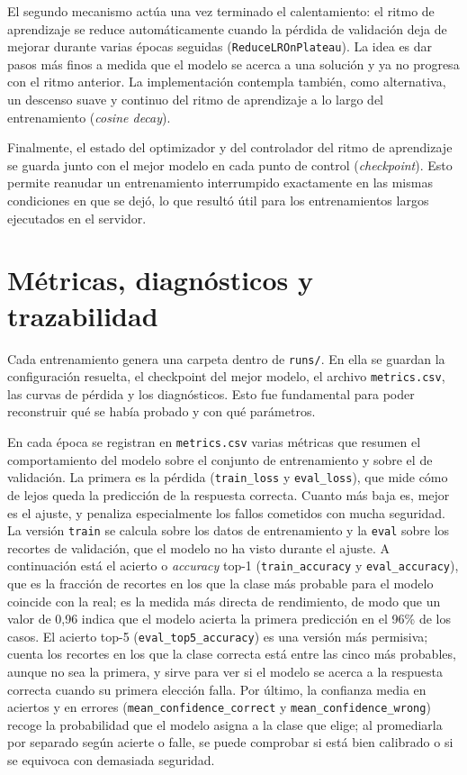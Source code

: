 El segundo mecanismo actúa una vez terminado el calentamiento: el ritmo de aprendizaje se reduce automáticamente cuando la pérdida de validación deja de mejorar durante varias épocas seguidas (\texttt{ReduceLROnPlateau}). La idea es dar pasos más finos a medida que el modelo se acerca a una solución y ya no progresa con el ritmo anterior. La implementación contempla también, como alternativa, un descenso suave y continuo del ritmo de aprendizaje a lo largo del entrenamiento (\textit{cosine decay}).

Finalmente, el estado del optimizador y del controlador del ritmo de aprendizaje se guarda junto con el mejor modelo en cada punto de control (\textit{checkpoint}). Esto permite reanudar un entrenamiento interrumpido exactamente en las mismas condiciones en que se dejó, lo que resultó útil para los entrenamientos largos ejecutados en el servidor.

\section{Métricas, diagnósticos y trazabilidad}

Cada entrenamiento genera una carpeta dentro de \texttt{runs/}. En ella se guardan la configuración resuelta, el checkpoint del mejor modelo, el archivo \texttt{metrics.csv}, las curvas de pérdida y los diagnósticos. Esto fue fundamental para poder reconstruir qué se había probado y con qué parámetros.

En cada época se registran en \texttt{metrics.csv} varias métricas que resumen el comportamiento del modelo sobre el conjunto de entrenamiento y sobre el de validación. La primera es la pérdida (\texttt{train\_loss} y \texttt{eval\_loss}), que mide cómo de lejos queda la predicción de la respuesta correcta. Cuanto más baja es, mejor es el ajuste, y penaliza especialmente los fallos cometidos con mucha seguridad. La versión \texttt{train} se calcula sobre los datos de entrenamiento y la \texttt{eval} sobre los recortes de validación, que el modelo no ha visto durante el ajuste. A continuación está el acierto o \textit{accuracy} top-1 (\texttt{train\_accuracy} y \texttt{eval\_accuracy}), que es la fracción de recortes en los que la clase más probable para el modelo coincide con la real; es la medida más directa de rendimiento, de modo que un valor de 0,96 indica que el modelo acierta la primera predicción en el 96\% de los casos. El acierto top-5 (\texttt{eval\_top5\_accuracy}) es una versión más permisiva; cuenta los recortes en los que la clase correcta está entre las cinco más probables, aunque no sea la primera, y sirve para ver si el modelo se acerca a la respuesta correcta cuando su primera elección falla. Por último, la confianza media en aciertos y en errores (\texttt{mean\_confidence\_correct} y \texttt{mean\_confidence\_wrong}) recoge la probabilidad que el modelo asigna a la clase que elige; al promediarla por separado según acierte o falle, se puede comprobar si está bien calibrado o si se equivoca con demasiada seguridad.

